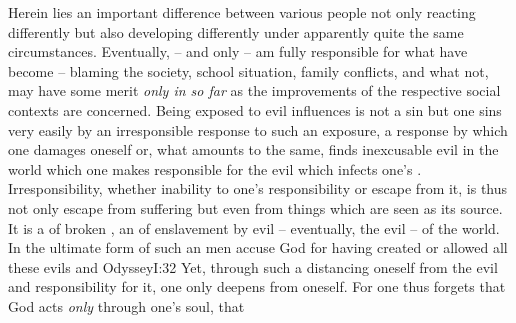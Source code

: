 Herein lies an important difference between various people not only reacting
differently but also developing differently under apparently quite the same
circumstances. Eventually,  -- and only  -- am fully responsible for
what  have become -- blaming the society, school situation, family
conflicts, and what not, may have some merit {\em only in so far} as the
 improvements of the respective social contexts are concerned.
Being exposed to evil influences is not a sin but one sins very easily by an
irresponsible response to such an exposure, a response by which one damages
oneself or, what amounts to the same, finds inexcusable evil in the world which
one makes responsible for the evil which infects one's .
Irresponsibility, whether inability to  one's responsibility or
escape from it, is thus not only escape from suffering but even from things
which are seen as its source.  It is a  of broken , an
 of enslavement by evil -- eventually, the  evil -- of
the world. In the ultimate form of such an  men accuse God for
having created or allowed all these evils and \citet{lay blame upon [...] gods
  for what is after all nothing but their own folly.}{Odyssey}{I:32} Yet,
through such a distancing oneself from the evil and responsibility for it, one
only deepens  from oneself. For one thus forgets that God acts
{\em only} through one's soul, that 

